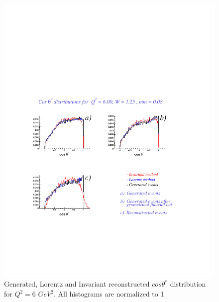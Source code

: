 \begin{figure}[h]
 \begin{center}
  \includegraphics[width = 12cm, bb = 60 140 540 540]{appendix/img/ctheta_q26.00_W1.25_mm0.08}
  \caption{Generated, Lorentz and Invariant reconstructed $cos\theta^*$ distribution for $Q^2=6$ $GeV^2$.
           All histograms are normalized to 1.}
 \end{center}
\end{figure} 
